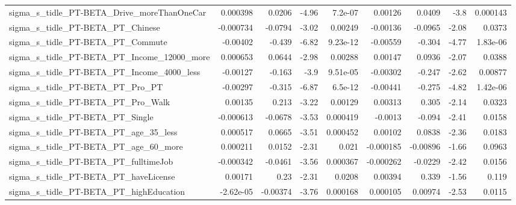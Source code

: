 \begin{tabular}{lrrrrrrrr}
sigma\_s\_tidle\_PT-BETA\_Drive\_moreThanOneCar         &    0.000398 &       0.0206 &     -4.96 &  7.2e-07 &    0.00126 &      0.0409 &         -3.8 &      0.000143 \\
sigma\_s\_tidle\_PT-BETA\_PT\_Chinese                   &   -0.000734 &      -0.0794 &     -3.02 &  0.00249 &   -0.00136 &     -0.0965 &        -2.08 &        0.0373 \\
sigma\_s\_tidle\_PT-BETA\_PT\_Commute                   &    -0.00402 &       -0.439 &     -6.82 & 9.23e-12 &   -0.00559 &      -0.304 &        -4.77 &      1.83e-06 \\
sigma\_s\_tidle\_PT-BETA\_PT\_Income\_12000\_more         &    0.000653 &       0.0644 &     -2.98 &  0.00288 &    0.00147 &      0.0936 &        -2.07 &        0.0388 \\
sigma\_s\_tidle\_PT-BETA\_PT\_Income\_4000\_less          &    -0.00127 &       -0.163 &      -3.9 & 9.51e-05 &   -0.00302 &      -0.247 &        -2.62 &       0.00877 \\
sigma\_s\_tidle\_PT-BETA\_PT\_Pro\_PT                    &    -0.00297 &       -0.315 &     -6.87 &  6.5e-12 &   -0.00441 &      -0.275 &        -4.82 &      1.42e-06 \\
sigma\_s\_tidle\_PT-BETA\_PT\_Pro\_Walk                  &     0.00135 &        0.213 &     -3.22 &  0.00129 &    0.00313 &       0.305 &        -2.14 &        0.0323 \\
sigma\_s\_tidle\_PT-BETA\_PT\_Single                    &   -0.000613 &      -0.0678 &     -3.53 & 0.000419 &    -0.0013 &      -0.094 &        -2.41 &        0.0158 \\
sigma\_s\_tidle\_PT-BETA\_PT\_age\_35\_less               &    0.000517 &       0.0665 &     -3.51 & 0.000452 &    0.00102 &      0.0838 &        -2.36 &        0.0183 \\
sigma\_s\_tidle\_PT-BETA\_PT\_age\_60\_more               &    0.000211 &       0.0152 &     -2.31 &    0.021 &  -0.000185 &    -0.00896 &        -1.66 &        0.0963 \\
sigma\_s\_tidle\_PT-BETA\_PT\_fulltimeJob               &   -0.000342 &      -0.0461 &     -3.56 & 0.000367 &  -0.000262 &     -0.0229 &        -2.42 &        0.0156 \\
sigma\_s\_tidle\_PT-BETA\_PT\_haveLicense               &     0.00171 &         0.23 &     -2.31 &   0.0208 &    0.00394 &       0.339 &        -1.56 &         0.119 \\
sigma\_s\_tidle\_PT-BETA\_PT\_highEducation             &   -2.62e-05 &     -0.00374 &     -3.76 & 0.000168 &   0.000105 &     0.00974 &        -2.53 &        0.0115 \\

\end{tabular}

